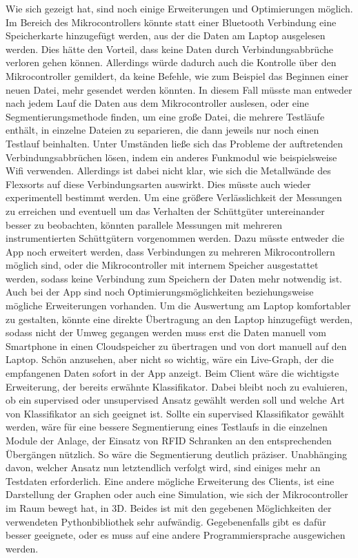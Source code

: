 Wie sich gezeigt hat, sind noch einige Erweiterungen und Optimierungen möglich. 
Im Bereich des Mikrocontrollers könnte statt einer Bluetooth Verbindung eine Speicherkarte hinzugefügt werden, aus der die Daten am Laptop ausgelesen werden. Dies hätte den Vorteil, dass keine Daten durch Verbindungsabbrüche verloren gehen können. Allerdings würde dadurch auch die Kontrolle über den Mikrocontroller gemildert, da keine Befehle, wie zum Beispiel das Beginnen einer neuen Datei, mehr gesendet werden könnten. In diesem Fall müsste man entweder nach jedem Lauf die Daten aus dem Mikrocontroller auslesen, oder eine Segmentierungsmethode finden, um eine große Datei, die mehrere Testläufe enthält, in einzelne Dateien zu separieren, die dann jeweils nur noch einen Testlauf beinhalten.
Unter Umständen ließe sich das Probleme der auftretenden Verbindungsabbrüchen lösen, indem ein anderes Funkmodul wie beispielsweise Wifi verwenden. Allerdings ist dabei nicht klar, wie sich die Metallwände des Flexsorts auf diese Verbindungsarten auswirkt. Dies müsste auch wieder experimentell bestimmt werden.
Um eine größere Verlässlichkeit der Messungen zu erreichen und eventuell um das Verhalten der Schüttgüter untereinander besser zu beobachten, könnten parallele Messungen mit mehreren instrumentierten Schüttgütern vorgenommen werden. Dazu müsste entweder die App noch erweitert werden, dass Verbindungen zu mehreren Mikrocontrollern möglich sind, oder die Mikrocontroller mit internem Speicher ausgestattet werden, sodass keine Verbindung zum Speichern der Daten mehr notwendig ist.
Auch bei der App sind noch Optimierungsmöglichkeiten beziehungsweise mögliche Erweiterungen vorhanden. Um die Auswertung am Laptop komfortabler zu gestalten, könnte eine direkte Übertragung an den Laptop hinzugefügt werden, sodass nicht der Umweg gegangen werden muss erst die Daten manuell vom Smartphone in einen Cloudspeicher zu übertragen und von dort manuell auf den Laptop.
Schön anzusehen, aber nicht so wichtig, wäre ein Live-Graph, der die empfangenen Daten sofort in der App anzeigt.
Beim Client wäre die wichtigste Erweiterung, der bereits erwähnte Klassifikator. Dabei bleibt noch zu evaluieren, ob ein supervised oder unsupervised Ansatz gewählt werden soll und welche Art von Klassifikator an sich geeignet ist. Sollte ein supervised Klassifikator gewählt werden, wäre für eine bessere Segmentierung eines Testlaufs in die einzelnen Module der Anlage, der Einsatz von RFID Schranken an den entsprechenden Übergängen nützlich. So wäre die Segmentierung deutlich präziser. Unabhänging davon, welcher Ansatz nun letztendlich verfolgt wird, sind einiges mehr an Testdaten erforderlich.
Eine andere mögliche Erweiterung des Clients, ist eine Darstellung der Graphen oder auch eine Simulation, wie sich der Mikrocontroller im Raum bewegt hat, in 3D. Beides ist mit den gegebenen Möglichkeiten der verwendeten Pythonbibliothek sehr aufwändig. Gegebenenfalls gibt es dafür besser geeignete, oder es muss auf eine andere Programmiersprache ausgewichen werden.

